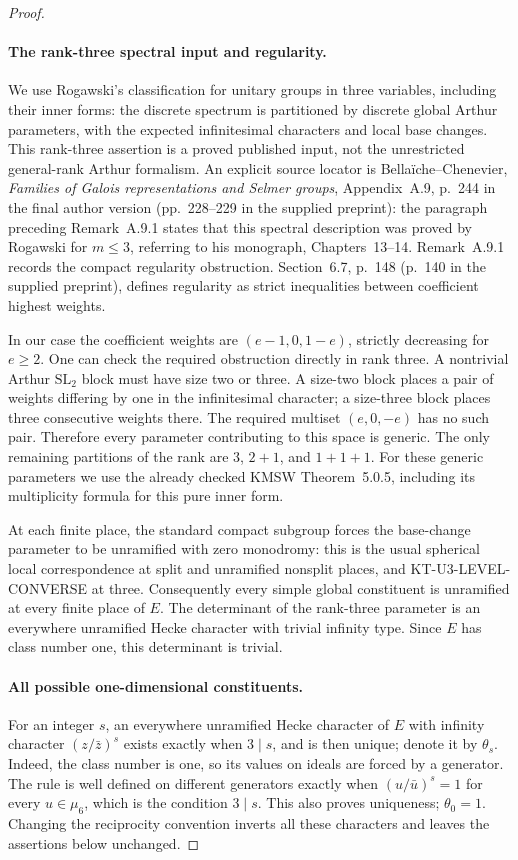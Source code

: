 \begin{proof}
\paragraph{The rank-three spectral input and regularity.}
We use Rogawski's classification for unitary groups in three variables,
including their inner forms: the discrete spectrum is partitioned by
discrete global Arthur parameters, with the expected infinitesimal
characters and local base changes. This rank-three assertion is a
proved published input, not the unrestricted general-rank Arthur
formalism. An explicit source locator is Bella\"iche--Chenevier,
\emph{Families of Galois representations and Selmer groups},
Appendix~A.9, p.~244 in the final author version
(pp.~228--229 in the supplied preprint): the paragraph
preceding Remark~A.9.1 states that this spectral description was proved
by Rogawski for $m\le3$, referring to his monograph, Chapters~13--14.
Remark~A.9.1 records the compact regularity obstruction. Section~6.7,
p.~148 (p.~140 in the supplied preprint), defines regularity as strict inequalities between coefficient
highest weights.

In our case the coefficient weights are $(e-1,0,1-e)$, strictly
decreasing for $e\ge2$. One can check the required obstruction directly
in rank three. A nontrivial Arthur $\mathrm{SL}_2$ block must have size
two or three. A size-two block places a pair of weights differing by
one in the infinitesimal character; a size-three block places three
consecutive weights there. The required multiset $(e,0,-e)$ has no
such pair. Therefore every parameter contributing to this space is
generic. The only remaining partitions of the rank are $3$, $2+1$,
and $1+1+1$. For these generic parameters we use the already checked
KMSW Theorem~5.0.5, including its multiplicity formula for this pure
inner form.

At each finite place, the standard compact subgroup forces the
base-change parameter to be unramified with zero monodromy:
this is the usual spherical local correspondence at split and
unramified nonsplit places, and KT-U3-LEVEL-CONVERSE at three.
Consequently every simple global constituent is unramified at every
finite place of $E$. The determinant of the rank-three parameter is
an everywhere unramified Hecke character with trivial infinity type.
Since $E$ has class number one, this determinant is trivial.

\paragraph{All possible one-dimensional constituents.}
For an integer $s$, an everywhere unramified Hecke character of $E$
with infinity character $(z/\bar z)^s$ exists exactly when $3\mid s$,
and is then unique; denote it by $\theta_s$.
Indeed, the class number is one, so its values on ideals are forced
by a generator. The rule is well defined on different generators
exactly when $(u/\bar u)^s=1$ for every $u\in\mu_6$, which is the
condition $3\mid s$. This also proves uniqueness; $\theta_0=1$.
Changing the reciprocity convention inverts all these characters
and leaves the assertions below unchanged.


\end{proof}
